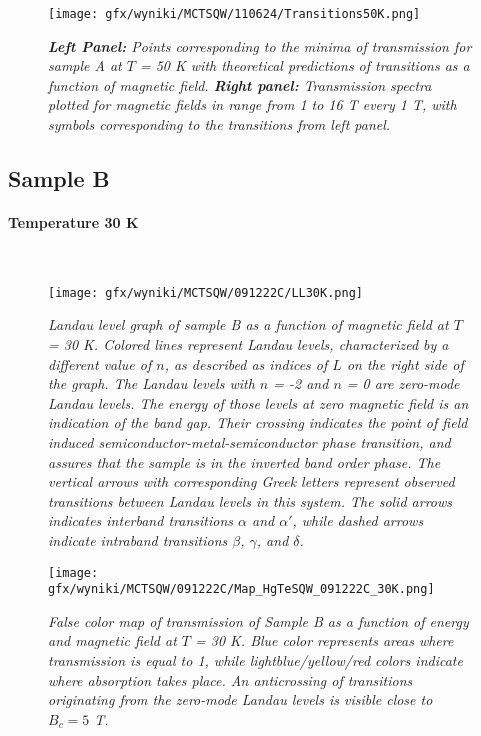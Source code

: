 \documentclass[titlepage,a4paper]{book}
\newcommand{\wciecie}{\quad\phantom{v}}
\newcommand{\myparagraph}[1]{\paragraph{#1}\mbox{}\\}
\begin{document}
\begin{figure}[H]
	\centering
	\texttt{[image: gfx/wyniki/MCTSQW/110624/Transitions50K.png]}
	\vspace{-10pt}
	\caption{\textit{\textbf{Left Panel:} Points corresponding to the minima of transmission for sample A at $T$ = 50 K with theoretical predictions of transitions as a function of magnetic field. \textbf{Right panel:} Transmission spectra plotted for magnetic fields in range from 1 to 16 T every 1 T, with symbols corresponding to the transitions from left panel.}}
	\label{fig:Transitions_110624_50K}
\end{figure}

\subsection{Sample B}
\myparagraph{Temperature 30 K}
\wciecie
\begin{figure}[H]
	\centering
	\texttt{[image: gfx/wyniki/MCTSQW/091222C/LL30K.png]}
	\vspace{-10pt}
	\caption{\textit{Landau level graph of sample B as a function of magnetic field at $T$ = 30 K. Colored lines represent Landau levels, characterized by a different value of $n$, as described as indices of $L$ on the right side of the graph. The Landau levels with $n$ = -2 and $n$ = 0 are zero-mode Landau levels. The energy of those levels at zero magnetic field is an indication of the band gap. Their crossing indicates the point of field induced semiconductor-metal-semiconductor phase transition, and assures that the sample is in the inverted band order phase. The vertical arrows with corresponding Greek letters represent observed transitions between Landau levels in this system. The solid arrows indicates interband transitions $\alpha$ and $\alpha'$, while dashed arrows indicate intraband transitions $\beta$, $\gamma$, and $\delta$.}}
	\label{fig:LL_SQW_30K}
\end{figure}

\begin{figure}[H]
	\centering
	\texttt{[image: gfx/wyniki/MCTSQW/091222C/Map\_HgTeSQW\_091222C\_30K.png]}
	\vspace{-10pt}
	\caption{\textit{False color map of transmission of Sample B as a function of energy and magnetic field at $T$ = 30 K. Blue color represents areas where transmission is equal to 1, while lightblue/yellow/red colors indicate where absorption takes place. An anticrossing of transitions originating from the zero-mode Landau levels is visible close to $B_c = 5$ T. }}
	\label{fig:Map_SQW_30K}
\end{figure}
\end{document}
